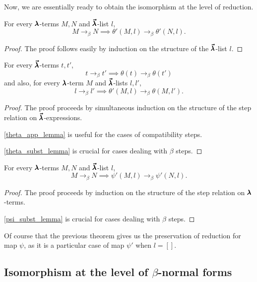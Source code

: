 Now, we are essentially ready to obtain the isomorphism at the level of reduction.

\begin{lemma}
  \label{theta_step_lemma}
  For every $\pmb{\lambda}$-terms $M, N$ and $\pmb{\vec \lambda}$-list $l$,
  \[ M \to_{\beta} N \implies \theta'(M, l) \to_{\beta} \theta'(N, l). \]
\end{lemma}
\begin{proof}
  The proof follows easily by induction on the structure of the $\pmb{\vec \lambda}$-list $l$.
\end{proof}

\begin{theorem}
  \label{theta_step_pres}
  For every $\pmb{\vec \lambda}$-terms $t, t'$,
  \[ t \to_{\beta} t' \implies \theta(t) \to_{\beta} \theta(t') \]
  and also, for every $\pmb{\lambda}$-term $M$ and $\pmb{\vec \lambda}$-lists $l, l'$,
  \[ l \to_{\beta} l' \implies \theta'(M, l) \to_{\beta} \theta(M, l'). \]
\end{theorem}
\begin{proof}
  The proof proceeds by simultaneous induction on the structure of the step relation on $\pmb{\vec \lambda}$-expressions.

  \cref{theta_app_lemma} is useful for the cases of compatibility steps.

  \cref{theta_subst_lemma} is crucial for cases dealing with $\beta$ steps.
\end{proof}


\begin{theorem}
  \label{psi_step_pres}
  For every $\pmb{\lambda}$-terms $M, N$ and $\pmb{\vec \lambda}$-list $l$,
  \[ M \to_{\beta} N \implies \psi'(M, l) \to_{\beta} \psi'(N, l). \]
\end{theorem}
\begin{proof}
  The proof proceeds by induction on the structure of the step relation on $\pmb{\lambda}$-terms.

  \cref{psi_subst_lemma} is crucial for cases dealing with $\beta$ steps.
\end{proof}

Of course that the previous theorem gives us the preservation of reduction for map $\psi$, as it is a particular case of map $\psi'$ when $l = []$.

\subsection{Isomorphism at the level of $\beta$-normal forms}

